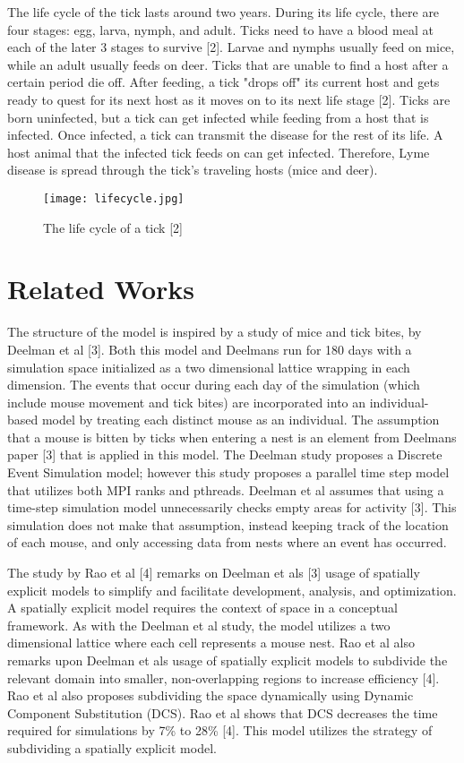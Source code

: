\documentclass[letterpaper, 10 pt, conference]{ieeeconf}  %
\begin{document}
The life cycle of the tick lasts around two years.  During its life cycle, there are four stages: egg, larva, nymph, and adult.  Ticks need to have a blood meal at each of the later 3 stages to survive [2].  Larvae and nymphs usually feed on mice, while an adult usually feeds on deer. Ticks that are unable to find a host after a certain period die off.  After feeding, a tick "drops off" its current host and gets ready to quest for its next host as it moves on to its next life stage [2].  Ticks are born uninfected, but a tick can get infected while feeding from a host that is infected.  Once infected, a tick can transmit the disease for the rest of its life.  A host animal that the infected tick feeds on can get infected.  Therefore, Lyme disease is spread through the tick’s traveling hosts (mice and deer). 

\begin{figure}
  \centering
  \texttt{[image: lifecycle.jpg]}
  \caption{The life cycle of a tick [2]}
\end{figure}

\section{Related Works}

The structure of the model is inspired by a study of mice and tick bites, by Deelman et al [3].  Both this model and Deelman\textquotesingle s run for 180 days with a simulation space initialized as a two dimensional lattice  wrapping in each dimension. The events that occur during each day of the simulation (which include mouse movement and tick bites) are incorporated into an individual-based model by treating each distinct mouse as an individual. The assumption that a mouse is bitten by ticks when entering a nest is an element from Deelman\textquotesingle s paper [3] that is applied in this model.  The Deelman study proposes a Discrete Event Simulation model; however this study proposes a parallel time step model that utilizes both MPI ranks and pthreads.  Deelman et al assumes that using a time-step simulation model unnecessarily checks empty areas for activity [3]. This simulation does not make that assumption, instead keeping track of the location of each mouse, and only accessing data from nests where an event has occurred.

The study by Rao et al [4] remarks on Deelman et al\textquotesingle s [3] usage of spatially explicit models to simplify and facilitate development, analysis, and optimization.  A spatially explicit model requires the context of space in a conceptual framework.  As with the Deelman et al study, the model utilizes a two dimensional lattice where each cell represents a mouse nest.  Rao et al also remarks upon Deelman et al\textquotesingle s usage of spatially explicit models to subdivide the relevant domain into smaller, non-overlapping regions to increase efficiency [4].  Rao et al also proposes subdividing the space dynamically using Dynamic Component Substitution (DCS).  Rao et al shows that DCS decreases the time required for simulations by 7\% to 28\% [4].  This model utilizes the strategy of subdividing a spatially explicit model.
\end{document}

